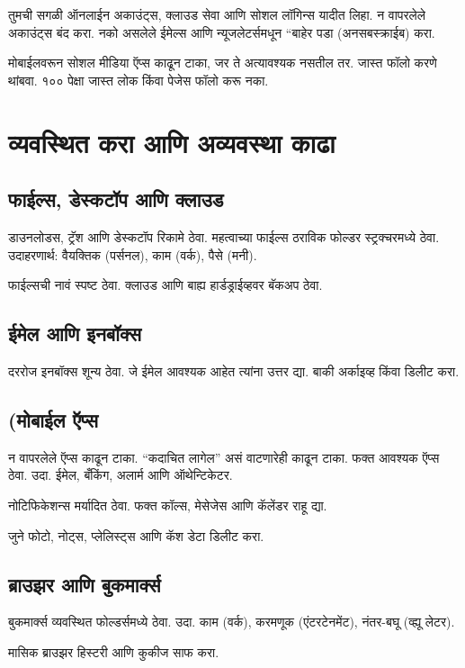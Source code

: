 तुमची सगळी ऑनलाईन अकाउंट्स, क्लाउड सेवा आणि सोशल लॉगिन्स यादीत लिहा. न वापरलेले अकाउंट्स बंद करा. नको असलेले ईमेल्स आणि न्यूजलेटर्समधून “बाहेर पडा  (अनसबस्क्राईब) करा.

मोबाईलवरून सोशल मीडिया ऍप्स काढून टाका, जर ते अत्यावश्यक नसतील तर. जास्त फॉलो करणे थांबवा.
१०० पेक्षा जास्त लोक किंवा पेजेस फॉलो करू नका.

\section*{व्यवस्थित करा आणि अव्यवस्था काढा}

\subsection*{फाईल्स, डेस्कटॉप आणि क्लाउड}

डाउनलोडस, ट्रॅश आणि डेस्कटॉप रिकामे ठेवा. महत्वाच्या फाईल्स ठराविक फोल्डर स्ट्रक्चरमध्ये ठेवा.
उदाहरणार्थ:  वैयक्तिक (पर्सनल), काम (वर्क), पैसे (मनी). 

फाईल्सची नावं स्पष्ट ठेवा. क्लाउड आणि बाह्य हार्डड्राईव्हवर बॅकअप ठेवा.

\subsection*{ईमेल आणि इनबॉक्स}

दररोज इनबॉक्स शून्य ठेवा. जे ईमेल आवश्यक आहेत त्यांना उत्तर द्या. बाकी अर्काइव्ह किंवा डिलीट करा.

\subsection*{(मोबाईल ऍप्स }

न वापरलेले ऍप्स काढून टाका. “कदाचित लागेल” असं वाटणारेही काढून टाका. फक्त आवश्यक ऍप्स ठेवा. उदा. ईमेल, बँकिंग, अलार्म आणि ऑथेन्टिकेटर.

नोटिफिकेशन्स मर्यादित ठेवा. फक्त कॉल्स, मेसेजेस आणि कॅलेंडर राहू द्या.

जुने फोटो, नोट्स, प्लेलिस्ट्स आणि कॅश डेटा डिलीट करा.

\subsection*{ ब्राउझर आणि बुकमार्क्स}

बुकमार्क्स व्यवस्थित फोल्डर्समध्ये ठेवा. उदा. काम (वर्क), करमणूक (एंटरटेनमेंट), नंतर-बघू (व्ह्यू लेटर).

मासिक ब्राउझर हिस्टरी आणि कुकीज साफ करा.



